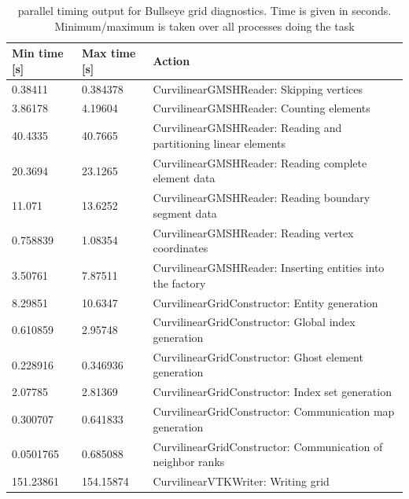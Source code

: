 \begin{table}
\centering
\begin{tabular}{l l l}
\hline
	Min time [s]	& Max time [s]	& Action \\ \hline
	0.38411		& 0.384378	& CurvilinearGMSHReader: Skipping vertices \\
	3.86178		& 4.19604	& CurvilinearGMSHReader: Counting elements \\
	40.4335		& 40.7665	& CurvilinearGMSHReader: Reading and partitioning linear elements \\
	20.3694		& 23.1265	& CurvilinearGMSHReader: Reading complete element data \\
	11.071		& 13.6252	& CurvilinearGMSHReader: Reading boundary segment data \\
	0.758839	& 1.08354	& CurvilinearGMSHReader: Reading vertex coordinates \\
	3.50761		& 7.87511	& CurvilinearGMSHReader: Inserting entities into the factory \\
	8.29851		& 10.6347	& CurvilinearGridConstructor: Entity generation \\
	0.610859	& 2.95748	& CurvilinearGridConstructor: Global index generation \\
	0.228916	& 0.346936	& CurvilinearGridConstructor: Ghost element generation \\
	2.07785		& 2.81369	& CurvilinearGridConstructor: Index set generation \\
	0.300707	& 0.641833	& CurvilinearGridConstructor: Communication map generation \\
	0.0501765	& 0.685088	& CurvilinearGridConstructor: Communication of neighbor ranks \\
	151.23861	& 154.15874	& CurvilinearVTKWriter: Writing grid
\end{tabular}
\caption{\curvgrid{} parallel timing output for Bullseye grid diagnostics. Time is given in seconds. Minimum/maximum is taken over all processes doing the task}
\label{table:impl:storage:timelog}
\end{table}


